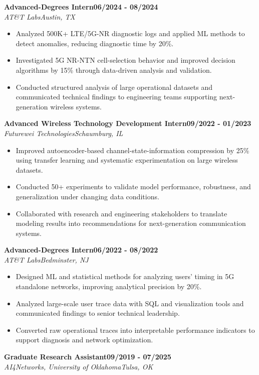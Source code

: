 \documentclass[9pt,letterpaper]{extarticle}
\newcommand{\role}[4]{%
  \Needspace{4\baselineskip}\textbf{#1}\hfill\textbf{#2}\\[-1pt]
  \textit{#3}\hfill\textit{#4}\par}
\begin{document}
\role{Advanced-Degrees Intern}{06/2024 - 08/2024}{AT\&T Labs}{Austin, TX}
\begin{itemize}
\item Analyzed 500K+ LTE/5G-NR diagnostic logs and applied ML methods to detect anomalies, reducing diagnostic time by 20\%.
\item Investigated 5G NR-NTN cell-selection behavior and improved decision algorithms by 15\% through data-driven analysis and validation.
\item Conducted structured analysis of large operational datasets and communicated technical findings to engineering teams supporting next-generation wireless systems.
\end{itemize}
\role{Advanced Wireless Technology Development Intern}{09/2022 - 01/2023}{Futurewei Technologies}{Schaumburg, IL}
\begin{itemize}
\item Improved autoencoder-based channel-state-information compression by 25\% using transfer learning and systematic experimentation on large wireless datasets.
\item Conducted 50+ experiments to validate model performance, robustness, and generalization under changing data conditions.
\item Collaborated with research and engineering stakeholders to translate modeling results into recommendations for next-generation communication systems.
\end{itemize}
\role{Advanced-Degrees Intern}{06/2022 - 08/2022}{AT\&T Labs}{Bedminster, NJ}
\begin{itemize}
\item Designed ML and statistical methods for analyzing users' timing in 5G standalone networks, improving analytical precision by 20\%.
\item Analyzed large-scale user trace data with SQL and visualization tools and communicated findings to senior technical leadership.
\item Converted raw operational traces into interpretable performance indicators to support diagnosis and network optimization.
\end{itemize}
\role{Graduate Research Assistant}{09/2019 - 07/2025}{AI4Networks, University of Oklahoma}{Tulsa, OK}
\end{document}
